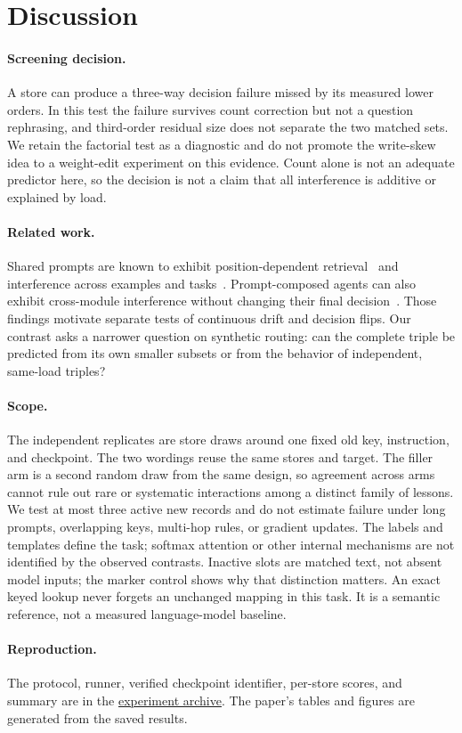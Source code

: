 \section{Discussion}

\paragraph{Screening decision.}
A store can produce a three-way decision failure missed by its measured lower orders.
In this test the failure survives count correction but not a question rephrasing, and third-order residual size does not separate the two matched sets.
We retain the factorial test as a diagnostic and do not promote the write-skew idea to a weight-edit experiment on this evidence.
Count alone is not an adequate predictor here, so the decision is not a claim that all interference is additive or explained by load.

\paragraph{Related work.}
Shared prompts are known to exhibit position-dependent retrieval~\citep{liu2024} and interference across examples and tasks~\citep{rod2026,li2026}.
Prompt-composed agents can also exhibit cross-module interference without changing their final decision~\citep{lin2026}.
Those findings motivate separate tests of continuous drift and decision flips.
Our contrast asks a narrower question on synthetic routing: can the complete triple be predicted from its own smaller subsets or from the behavior of independent, same-load triples?

\paragraph{Scope.}
The independent replicates are store draws around one fixed old key, instruction, and checkpoint.
The two wordings reuse the same stores and target.
The filler arm is a second random draw from the same design, so agreement across arms cannot rule out rare or systematic interactions among a distinct family of lessons.
We test at most three active new records and do not estimate failure under long prompts, overlapping keys, multi-hop rules, or gradient updates.
The labels and templates define the task; softmax attention or other internal mechanisms are not identified by the observed contrasts.
Inactive slots are matched text, not absent model inputs; the marker control shows why that distinction matters.
An exact keyed lookup never forgets an unchanged mapping in this task. It is a semantic reference, not a measured language-model baseline.

\paragraph{Reproduction.}
The protocol, runner, verified checkpoint identifier, per-store scores, and summary are in the
\href{https://github.com/manojbajaj95/cl/tree/7932640bbf3067fd87245dbefaecef5a694e8a5b/experiments/write_skew}{experiment archive}.
The paper's tables and figures are generated from the saved results.
